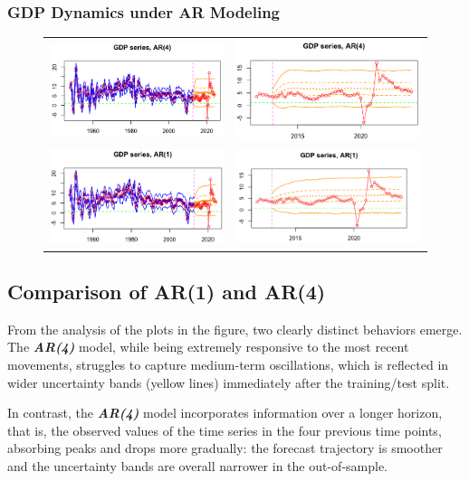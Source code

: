 \documentclass{Configuration_Files/PoliMi3i_thesis}
\begin{document}
\subsubsection{GDP Dynamics under AR Modeling}
\begin{figure}[H]
  \centering
  \begin{tabular}{@{}cc@{}}
    \includegraphics[angle=90,width=0.33\linewidth]{FAR(4)-1.png} &
    \includegraphics[angle=90,width=0.33\linewidth]{ZAR(4)-1.png} \\
    \includegraphics[angle=90,width=0.33\linewidth]{FAR(1)-2.png} &
    \includegraphics[angle=90,width=0.335\linewidth]{ZAR(1)-1.png}
  \end{tabular}
\end{figure}
\restoregeometry

\subsection*{Comparison of AR(1) and AR(4)}
From the analysis of the plots in the figure, two clearly distinct behaviors emerge. The \textbf{\textit{AR(4)}} model, while being extremely responsive to the most recent movements, struggles to capture medium-term oscillations, which is reflected in wider uncertainty bands (yellow lines) immediately after the training/test split.


In contrast, the \textbf{\textit{AR(4)}} model incorporates information over a longer horizon, that is, the observed values of the time series in the four previous time points, absorbing peaks and drops more gradually: the forecast trajectory is smoother and the uncertainty bands are overall narrower in the out-of-sample. 
\end{document}
